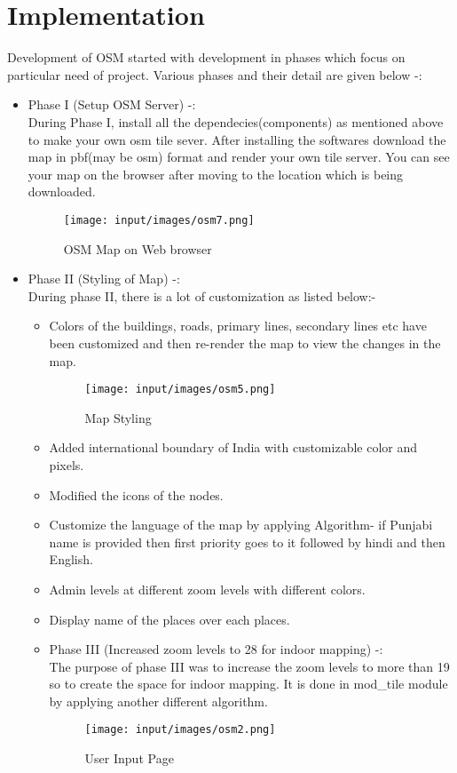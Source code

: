 \section{Implementation}
Development of OSM started with development in phases which focus on particular need of project.
Various phases and their detail are given below -:
\begin{itemize}
\item Phase I (Setup OSM Server) -: \\
        During Phase I, install all the dependecies(components) as mentioned above to make your own osm tile sever. After installing the softwares download the map in pbf(may be osm) format and render your own tile server. You can see your map on the browser after moving to the location which is being downloaded.

\begin{figure}[ht]
\centering \texttt{[image: input/images/osm7.png]}
\caption{OSM Map on Web browser}
\end{figure}

\item Phase II (Styling of Map) -: \\
        During phase II, there is a lot of customization as listed below:-
\begin{itemize}
\item Colors of the buildings, roads, primary lines, secondary lines etc have been customized and then re-render the map to view the changes in the map.
\begin{figure}[ht]
\centering \texttt{[image: input/images/osm5.png]}
\caption{Map Styling}
\end{figure}

\item Added international boundary of India with customizable color and pixels.
\item Modified the icons of the nodes.
\item Customize the language of the map by applying Algorithm- if Punjabi name is provided then first priority goes to it followed by hindi and then English.
\item Admin levels at different zoom levels with different colors.	
\item Display name of the places over each places.

\item Phase III (Increased zoom levels to 28 for indoor mapping) -: \\
	        The purpose of phase III was to increase the zoom levels to more than 19 so to create the space for indoor mapping. It is done in mod\_tile module by applying another different algorithm. 
		\begin{figure}[ht]
			\centering \texttt{[image: input/images/osm2.png]}
			\caption{User Input Page}
		\end{figure}


\end{itemize}
\end{itemize}
